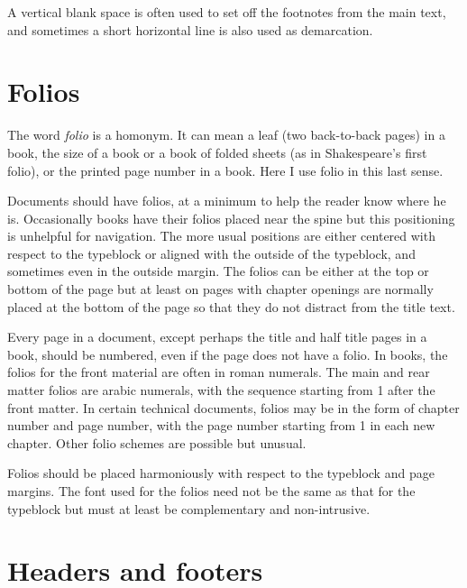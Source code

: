 \documentclass[10pt,letterpaper]{memoir}
\begin{document}
    A vertical blank space is often used to set off the footnotes from the
main text, and sometimes a short horizontal line is also used as demarcation.


\section{Folios}


    The word \emph{folio} is a homonym. It can mean a leaf 
(two back-to-back pages) in a book, the size of a book or a book of
folded sheets (as in Shakespeare's first folio), or the printed page number
in a book. Here I use folio in this last sense.

    Documents should have folios, at a minimum to help the reader know where
he is. Occasionally books have their folios placed near the spine but this
positioning is unhelpful for navigation. The more usual positions are
either centered with respect to the typeblock or aligned with the outside
of the typeblock, and sometimes even in the outside margin. The folios
can be either at the top or bottom of the page but at least on pages 
with chapter openings are normally placed at the bottom of the page so that
they do not distract from the title text.

    Every page in a document, except perhaps the title and half title pages
in a book, should be numbered, even if the page does not have a folio. 
In books, the folios for the front material are often in roman numerals.
The main and rear matter folios are arabic numerals, with the sequence
starting from 1 after the front matter. In certain technical documents,
folios may be in the form of chapter number and page number, with the page 
number starting from 1 in each new chapter. Other folio schemes are possible 
but unusual.

    Folios should be placed harmoniously with respect to the typeblock and
page margins. The font used for the folios need not be the same as that
for the typeblock but must at least be complementary and non-intrusive.


\section{Headers and footers}
\end{document}
